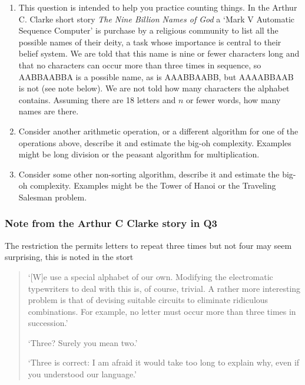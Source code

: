\documentclass[11pt,a4paper]{scrartcl}
\begin{document}
\begin{enumerate}
\item This question is intended to help you practice counting
  things. In the Arthur C. Clarke short story \textsl{The Nine Billion
    Names of God} a \lq{}Mark V Automatic Sequence Computer\rq{} is
  purchase by a religious community to list all the possible names of
  their deity, a task whose importance is central to their belief
  system. We are told that this name is nine or fewer characters long
  and that no characters can occur more than three times in sequence,
  so AABBAABBA is a possible name, as is AAABBAABB, but AAAABBAAB is
  not (see note below). We are not told how many characters the alphabet
  contains. Assuming there are 18 letters and $n$ or fewer words, how
  many names are there.

\item Consider another arithmetic operation, or a different algorithm for one of the operations above, describe it and estimate the big-oh complexity. Examples might be long division or the peasant algorithm for multiplication.

\item Consider some other non-sorting algorithm, describe it and
  estimate the big-oh complexity. Examples might be the Tower of Hanoi
  or the Traveling Salesman problem.
\end{enumerate}

\subsubsection*{Note from the Arthur C Clarke story in Q3}

The restriction the permits letters to repeat three times but not four may seem surprising, this is noted in the stort
\begin{quotation}
\lq{}[W]e use a special alphabet of our own. Modifying the electromatic typewriters to deal with this is, of course, trivial. A rather more interesting problem is that of devising suitable circuits to eliminate ridiculous combinations. For example, no letter must occur more than three times in succession.\rq{}

\lq{}Three? Surely you mean two.\rq{}

\lq{}Three is correct: I am afraid it would take too long to explain why, even if you understood our language.\rq{}
\end{quotation}
\end{document}

